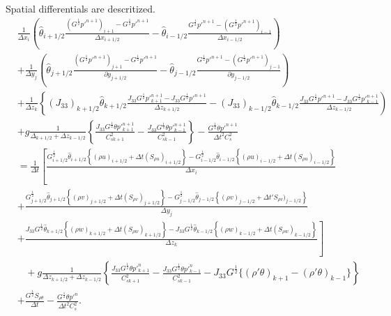 Spatial differentials are descritized.
\begin{align}
  & \frac{1}{\Delta x_i}\left(
   \hat{\theta}_{i+1/2}\frac{(G^{\frac{1}{2}}p'^{n+1})_{i+1}-G^{\frac{1}{2}}p'^{n+1}}{\Delta x_{i+1/2}}
  -\hat{\theta}_{i-1/2}\frac{G^{\frac{1}{2}}p'^{n+1}-(G^{\frac{1}{2}}p'^{n+1})_{i-1}}{\Delta x_{i-1/2}}
  \right) \nonumber\\&
  + \frac{1}{\Delta y_j}\left(
   \hat{\theta}_{j+1/2}\frac{(G^{\frac{1}{2}}p'^{n+1})_{j+1}-G^{\frac{1}{2}}p'^{n+1}}{\partial y_{j+1/2}}
  -\hat{\theta}_{j-1/2}\frac{G^{\frac{1}{2}}p'^{n+1}-(G^{\frac{1}{2}}p'^{n+1})_{j-1}}{\partial y_{j-1/2}}
 \right) \nonumber\\&
  + \frac{1}{\Delta z_k}\left\{
   (J_{33})_{k+1/2}\hat{\theta}_{k+1/2}\frac{J_{33}G^{\frac{1}{2}}p'^{n+1}_{k+1}-J_{33}G^{\frac{1}{2}}p'^{n+1}}{\Delta z_{k+1/2}}
  -(J_{33})_{k-1/2}\hat{\theta}_{k-1/2}\frac{J_{33}G^{\frac{1}{2}}p'^{n+1}-J_{33}G^{\frac{1}{2}}p'^{n+1}_{k-1}}{\Delta z_{k-1/2}}
  \right) \nonumber\\&
  + g \frac{1}{\Delta_{k+1/2}+\Delta z_{k-1/2}} \left\{
   \frac{J_{33}G^{\frac{1}{2}}\theta p'^{n+1}_{k+1}}{C^2_{s k+1}}
  -\frac{J_{33}G^{\frac{1}{2}}\theta p'^{n+1}_{k-1}}{C^2_{s k-1}} \right\}
  - \frac{G^{\frac{1}{2}}\theta p'^{n+1}}{\Delta t^2 C^2_s} \nonumber\\
  &=
  \frac{1}{\Delta t}\left[
      \frac{
         G^{\frac{1}{2}}_{i+1/2}\hat{\theta}_{i+1/2}\left\{(\rho u)_{i+1/2} + \Delta t (S_{\rho u})_{i+1/2}\right\}
        -G^{\frac{1}{2}}_{i-1/2}\hat{\theta}_{i-1/2}\left\{(\rho u)_{i-1/2} + \Delta t (S_{\rho u})_{i-1/2}\right\}
      }{\Delta x_i} \right.\nonumber\\&
    + \frac{
        G^{\frac{1}{2}}_{j+1/2}\hat{\theta}_{j+1/2}\left\{(\rho v)_{j+1/2} + \Delta t (S_{\rho v})_{j+1/2}\right\}
       -G^{\frac{1}{2}}_{j-1/2}\hat{\theta}_{j-1/2}\left\{(\rho v)_{j-1/2} + \Delta t 'S_{\rho v})_{j-1/2}\right\}
      }{\Delta y_j} \nonumber\\& \left.
    + \frac{
        J_{33}G^{\frac{1}{2}}\hat{\theta}_{k+1/2}\left\{(\rho w)_{k+1/2} + \Delta t (S_{\rho w})_{k+1/2}\right\}
       -J_{33}G^{\frac{1}{2}}\hat{\theta}_{k-1/2}\left\{(\rho w)_{k-1/2} + \Delta t (S_{\rho w})_{k-1/2}\right\}
      }{\Delta z_k}
    \right] \nonumber\\&\;\;\;
  + g \frac{1}{\Delta z_{k+1/2}+\Delta z_{k-1/2}}\left\{
    \frac{J_{33}G^{\frac{1}{2}}\theta p'^n_{k+1}}{C^2_{s k+1}}
   -\frac{J_{33}G^{\frac{1}{2}}\theta p'^n_{k-1}}{C^2_{s k-1}}
   - J_{33}G^{\frac{1}{2}} \{(\rho'\theta)_{k+1} - (\rho'\theta)_{k-1}\}
  \right\} \nonumber\\&
  + \frac{G^{\frac{1}{2}} S_{\rho\theta}}{\Delta t}
  - \frac{G^{\frac{1}{2}}\theta p'^n}{\Delta t^2 C^2_s}.
\end{align}
